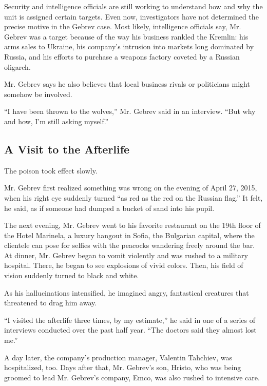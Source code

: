 Security and intelligence officials are still working to understand how
and why the unit is assigned certain targets. Even now, investigators
have not determined the precise motive in the Gebrev case. Most likely,
intelligence officials say, Mr. Gebrev was a target because of the way
his business rankled the Kremlin: his arms sales to Ukraine, his
company's intrusion into markets long dominated by Russia, and his
efforts to purchase a weapons factory coveted by a Russian oligarch.

Mr. Gebrev says he also believes that local business rivals or
politicians might somehow be involved.

``I have been thrown to the wolves,'' Mr. Gebrev said in an interview.
``But why and how, I'm still asking myself.''

\hypertarget{a-visit-to-the-afterlife}{%
\subsection{A Visit to the Afterlife}\label{a-visit-to-the-afterlife}}

The poison took effect slowly.

Mr. Gebrev first realized something was wrong on the evening of April
27, 2015, when his right eye suddenly turned ``as red as the red on the
Russian flag.'' It felt, he said, as if someone had dumped a bucket of
sand into his pupil.

The next evening, Mr. Gebrev went to his favorite restaurant on the 19th
floor of the Hotel Marinela, a luxury hangout in Sofia, the Bulgarian
capital, where the clientele can pose for selfies with the peacocks
wandering freely around the bar. At dinner, Mr. Gebrev began to vomit
violently and was rushed to a military hospital. There, he began to see
explosions of vivid colors. Then, his field of vision suddenly turned to
black and white.

As his hallucinations intensified, he imagined angry, fantastical
creatures that threatened to drag him away.

``I visited the afterlife three times, by my estimate,'' he said in one
of a series of interviews conducted over the past half year. ``The
doctors said they almost lost me.''

A day later, the company's production manager, Valentin Tahchiev, was
hospitalized, too. Days after that, Mr. Gebrev's son, Hristo, who was
being groomed to lead Mr. Gebrev's company, Emco, was also rushed to
intensive care.


